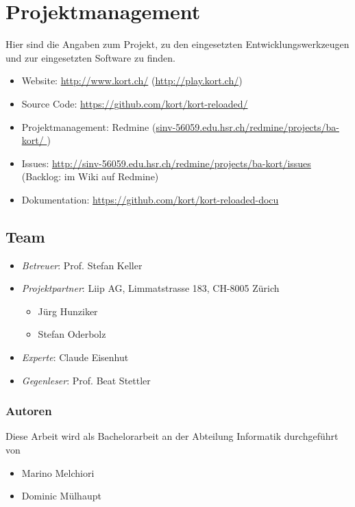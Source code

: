 \chapter{Projektmanagement}
\label{pm-projektmanagement}
Hier sind die Angaben zum Projekt, zu den eingesetzten Entwicklungswerkzeugen und zur eingesetzten Software zu finden.

\begin{itemize}
    \item Website: \url{http://www.kort.ch/} (\url{http://play.kort.ch/})
    \item Source Code: \url{https://github.com/kort/kort-reloaded/}
    \item Projektmanagement: Redmine (\url{sinv-56059.edu.hsr.ch/redmine/projects/ba-kort/ })
    \item Issues: \url{http://sinv-56059.edu.hsr.ch/redmine/projects/ba-kort/issues}  (Backlog: im Wiki auf Redmine) 
    \item Dokumentation: \url{https://github.com/kort/kort-reloaded-docu}
\end{itemize}

\section{Team}
\label{pm-team}
\begin{itemize}
	\item \textit{Betreuer}: Prof. Stefan Keller
	\item \textit{Projektpartner}: Liip AG, Limmatstrasse 183, CH-8005 Zürich
	\begin{itemize}
		\item Jürg Hunziker
		\item Stefan Oderbolz
	\end{itemize}
	\item \textit{Experte}: Claude Eisenhut
	\item \textit{Gegenleser}: Prof. Beat Stettler
\end{itemize}

\subsection*{Autoren}
\label{pm-team-autoren}
Diese Arbeit wird als Bachelorarbeit an der Abteilung Informatik durchgeführt von
\begin{itemize}
	\item Marino Melchiori
	\item Dominic Mülhaupt
\end{itemize}

